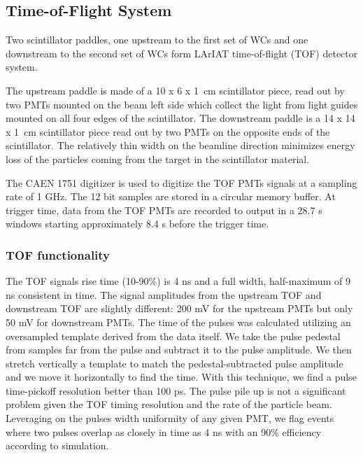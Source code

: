 \subsection{Time-of-Flight System}\label{sec:TOF}
Two scintillator paddles, one upstream to the first set of WCs and one downstream to the second set of WCs  form LArIAT  time-of-flight (TOF) detector system. 

The upstream paddle is made of a 10 x 6 x 1~cm scintillator piece, read out by two PMTs mounted on the beam left side which collect the light from light guides mounted on all four edges of the scintillator. The downstream paddle is a   14 x 14 x 1~cm scintillator piece read out by two PMTs on the opposite ends of the scintillator.
The relatively thin width on the beamline direction minimizes energy loss of the particles coming from the target in the scintillator material.

The CAEN 1751 digitizer is used to digitize the TOF PMTs signals at a sampling rate of 1 GHz. The 12 bit samples are stored in a circular memory buffer. At trigger time, data from the TOF PMTs are recorded to output in a 28.7 \textmu s windows starting  approximately 8.4 \textmu s before the trigger time. 


\subsubsection{TOF functionality}\label{sec:TOFfunc}


The TOF signals rise time (10-90\%) is 4 ns and a full width, half-maximum of 9 ns consistent in time. The signal amplitudes from the upstream TOF and  downstream TOF are slightly different:  200 mV for the upstream PMTs but only 50 mV for downstream PMTs. The time of the pulses was calculated utilizing an oversampled template derived from the data itself. We take the pulse pedestal from samples far from the pulse and subtract it to the pulse amplitude. We then stretch vertically a template to match the pedestal-subtracted pulse amplitude and we move it horizontally to find the time. With this technique, we find a pulse time-pickoff resolution better than 100 ps.  The pulse pile up is not a significant problem given the TOF timing resolution and the rate of the particle beam.  Leveraging on the pulses width uniformity of any given PMT,  we flag events where two pulses overlap as closely in time as 4 ns with an 90\% efficiency according to simulation. 


